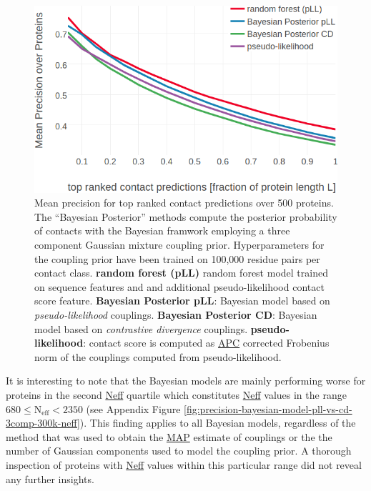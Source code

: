 \documentclass[11pt,a4paper,twoside]{book}
\theoremstyle{definition}
\theoremstyle{definition}
\theoremstyle{remark}
\begin{document}
\begin{figure}

{\centering \includegraphics[width=0.9\linewidth]{img/bayesian_model/benchmark/precision_vs_rank_pll_vs_cd_3comp_300k} 

}

\caption{Mean
precision for top ranked contact predictions over 500 proteins. The
``Bayesian Posterior'' methods compute the posterior probability of
contacts with the Bayesian framwork employing a three component Gaussian
mixture coupling prior. Hyperparameters for the coupling prior have been
trained on 100,000 residue pairs per contact class. \textbf{random
forest (pLL)} random forest model trained on sequence features and and
additional pseudo-likelihood contact score feature. \textbf{Bayesian
Posterior pLL}: Bayesian model based on \emph{pseudo-likelihood}
couplings. \textbf{Bayesian Posterior CD}: Bayesian model based on
\emph{contrastive divergence} couplings. \textbf{pseudo-likelihood}:
contact score is computed as \protect\hyperlink{abbrev}{APC} corrected
Frobenius norm of the couplings computed from pseudo-likelihood.}\label{fig:precision-bayesian-model-pll-vs-cd-3comp-300k}
\end{figure}

It is interesting to note that the Bayesian models are mainly performing
worse for proteins in the second \protect\hyperlink{abbrev}{Neff}
quartile which constitutes \protect\hyperlink{abbrev}{Neff} values in
the range \(680 \le \text{N}_{\text{eff}} < 2350\) (see Appendix Figure
\ref{fig:precision-bayesian-model-pll-vs-cd-3comp-300k-neff}). This
finding applies to all Bayesian models, regardless of the method that
was used to obtain the \protect\hyperlink{abbrev}{MAP} estimate of
couplings or the the number of Gaussian components used to model the
coupling prior. A thorough inspection of proteins with
\protect\hyperlink{abbrev}{Neff} values within this particular range did
not reveal any further insights.
\end{document}
